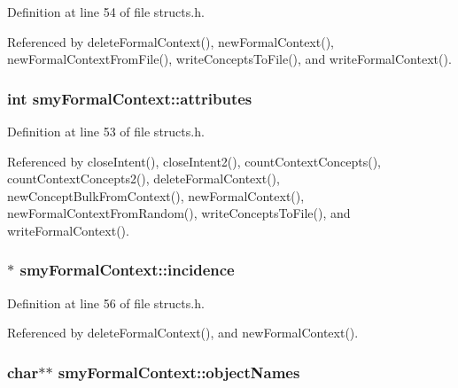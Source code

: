 \-Definition at line 54 of file structs.\-h.



\-Referenced by delete\-Formal\-Context(), new\-Formal\-Context(), new\-Formal\-Context\-From\-File(), write\-Concepts\-To\-File(), and write\-Formal\-Context().

\hypertarget{structsmyFormalContext_a4ae89e8f42fd7feab4db872cd8472b5e}{
\subsubsection[{attributes}]{\setlength{\rightskip}{0pt plus 5cm}int {\bf smy\-Formal\-Context\-::attributes}}}\label{structsmyFormalContext_a4ae89e8f42fd7feab4db872cd8472b5e}


\-Definition at line 53 of file structs.\-h.



\-Referenced by close\-Intent(), close\-Intent2(), count\-Context\-Concepts(), count\-Context\-Concepts2(), delete\-Formal\-Context(), new\-Concept\-Bulk\-From\-Context(), new\-Formal\-Context(), new\-Formal\-Context\-From\-Random(), write\-Concepts\-To\-File(), and write\-Formal\-Context().

\hypertarget{structsmyFormalContext_a55d9d4c2e38c3571e9f6e870bc1c06b8}{
\subsubsection[{incidence}]{$\ast$ {\bf smy\-Formal\-Context\-::incidence}}}\label{structsmyFormalContext_a55d9d4c2e38c3571e9f6e870bc1c06b8}


\-Definition at line 56 of file structs.\-h.



\-Referenced by delete\-Formal\-Context(), and new\-Formal\-Context().

\hypertarget{structsmyFormalContext_a732a2615921f2d209fb7d9341df2c183}{
\subsubsection[{object\-Names}]{\setlength{\rightskip}{0pt plus 5cm}char$\ast$$\ast$ {\bf smy\-Formal\-Context\-::object\-Names}}}\label{structsmyFormalContext_a732a2615921f2d209fb7d9341df2c183}


